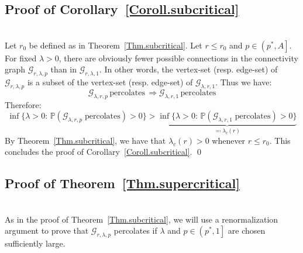 \documentclass[10pt,a4paper]{amsart}
\theoremstyle{exampstyle}
\theoremstyle{exampnotations}
\begin{document}
\subsection{Proof of Corollary~\ref{Coroll.subcritical}}\mbox{}\\
Let $r_0$ be defined as in Theorem~\ref{Thm.subcritical}. Let $r \leq r_0$ and $p \in \left( p^{*},A \right]$. For fixed $\lambda > 0$, there are obviously fewer possible connections in the connectivity graph $\mathcal{G}_{r,\lambda,p}$ than in $\mathcal{G}_{r,\lambda,1}$. In other words, the vertex-set (resp. edge-set) of $\mathcal{G}_{r,\lambda,p}$ is a subset of the vertex-set (resp. edge-set) of $\mathcal{G}_{\lambda,r,1}$. Thus we have:
\begin{equation*}
    \mathcal{G}_{\lambda,r,p} \, \text{percolates} \,  \Rightarrow \mathcal{G}_{\lambda,r,1} \, \text{percolates}
\end{equation*}
Therefore:
\begin{equation*}
    \inf \lbrace \lambda > 0 : \, \mathbb{P}(\mathcal{G}_{\lambda, r, p} \; \text{percolates}) > 0 \rbrace >   \underbrace{\inf \lbrace \lambda > 0 : \, \mathbb{P}(\mathcal{G}_{\lambda, r, 1} \; \text{percolates}) > 0 \rbrace}_{ \eqqcolon \lambda_c(r)}
\end{equation*}
By Theorem~\ref{Thm.subcritical}, we have that $\lambda_c(r) > 0$ whenever $r \leq r_0$. This concludes the proof of Corollary~\ref{Coroll.subcritical}. \qed

\subsection{Proof of Theorem~\ref{Thm.supercritical}}\mbox{}\\
As in the proof of Theorem~\ref{Thm.subcritical}, we will use a renormalization argument to prove that $\mathcal{G}_{r, \lambda, p}$ percolates if $\lambda$ and $p \in \left(p^{*},1\right]$ are chosen sufficiently large. 


\end{document}
